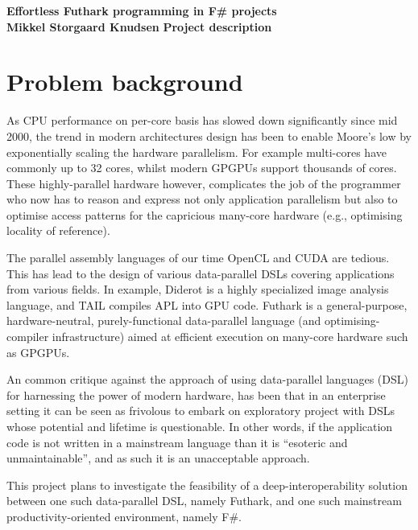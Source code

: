 \documentclass{article}
\begin{document}
\noindent
\textbf{Effortless Futhark programming in F\# projects}\\
\textbf{Mikkel Storgaard Knudsen}
\textbf{Project description}

\section{Problem background}

As CPU performance on per-core basis has slowed down significantly since
mid 2000, the trend in modern architectures design has been to enable 
Moore's low by exponentially scaling the hardware parallelism. 
For example multi-cores have commonly up to 32 cores, whilst modern 
GPGPUs support thousands of cores.
These highly-parallel hardware however, complicates the job of the 
programmer who now has to reason and express not only application 
parallelism but also to optimise access patterns for the capricious 
many-core hardware (e.g., optimising locality of reference).

The parallel assembly languages of our time OpenCL and CUDA are tedious.
This has lead to the design of various data-parallel DSLs covering 
applications from various fields. In example, Diderot\cite{pldi12} is a highly
specialized image analysis language, and TAIL\cite{fhcp16} compiles APL into GPU code.
Futhark is a general-purpose, hardware-neutral, purely-functional data-parallel 
language (and optimising-compiler infrastructure) aimed at efficient execution 
on many-core hardware such as GPGPUs\cite{pldi17}.

An common critique against the approach of using data-parallel languages (DSL) 
for harnessing the power of modern hardware, has been that in an enterprise 
setting it can be seen as frivolous to embark on exploratory project with 
DSLs whose potential and lifetime is questionable.  In other words, if the
application code is not written in a mainstream language than it is ``esoteric
and unmaintainable'', and as such it is an unacceptable approach.

This project plans to investigate the feasibility of a deep-interoperability
solution between one such data-parallel DSL, namely Futhark, and one such
mainstream productivity-oriented environment, namely F\#.
\end{document}
